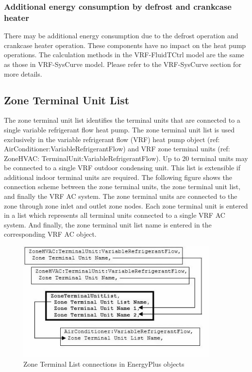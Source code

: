 \subsubsection{Additional energy consumption by defrost and crankcase heater}\label{additional-energy-consumption-by-defrost-and-crankcase-heater}

There may be additional energy consumption due to the defrost operation and crankcase heater operation. These components have no impact on the heat pump operations. The calculation methods in the VRF-FluidTCtrl model are the same as those in VRF-SysCurve model. Please refer to the VRF-SysCurve section for more details.

\subsection{Zone Terminal Unit List}\label{zone-terminal-unit-list}

The zone terminal unit list identifies the terminal units that are connected to a single variable refrigerant flow heat pump. The zone terminal unit list is used exclusively in the variable refrigerant flow (VRF) heat pump object (ref: AirConditioner:VariableRefrigerantFlow) and VRF zone terminal units (ref: ZoneHVAC: TerminalUnit:VariableRefrigerantFlow). Up to 20 terminal units may be connected to a single VRF outdoor condensing unit. This list is extensible if additional indoor terminal units are required. The following figure shows the connection scheme between the zone terminal units, the zone terminal unit list, and finally the VRF AC system. The zone terminal units are connected to the zone through zone inlet and outlet zone nodes. Each zone terminal unit is entered in a list which represents all terminal units connected to a single VRF AC system. And finally, the zone terminal unit list name is entered in the corresponding VRF AC object.

\begin{figure}[hbtp] %
\centering
\includegraphics[width=0.9\textwidth, height=0.9\textheight, keepaspectratio=true]{media/image5454.png}
\caption{Zone Terminal List connections in EnergyPlus objects \protect \label{fig:zone-terminal-list-connections-in-energyplus}}
\end{figure}

